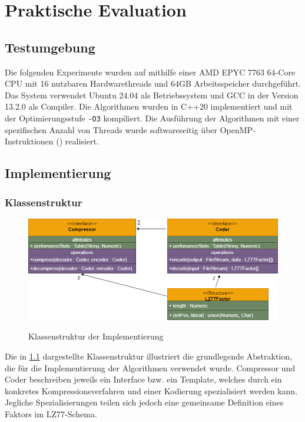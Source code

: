 \chapter{Praktische Evaluation} \label{sec:evaluation}

\section{Testumgebung}
Die folgenden Experimente wurden auf mithilfe einer AMD EPYC 7763 64-Core CPU mit 16 nutzbaren Hardwarethreads und 64GB Arbeitsspeicher durchgeführt. Das System
verwendet Ubuntu 24.04 als Betriebssystem und GCC in der Version 13.2.0 als Compiler. Die Algorithmen wurden in C++20 implementiert und mit der Optimierungsstufe
\texttt{-O3} kompiliert. Die Ausführung der Algorithmen mit einer spezifischen Anzahl von Threads wurde softwareseitig über OpenMP-Instruktionen (\cite{openmp}) realisiert. 

\section{Implementierung}

\subsection{Klassenstruktur}
\begin{figure}[ht]
    \centering
    \caption{Klassenstruktur der Implementierung}
    \includegraphics[scale=0.4]{Images/uml.png} \label{uml}
\end{figure}

Die in \ref{uml} dargestellte Klassenstruktur illustriert die grundlegende Abstraktion, die für die Implementierung der Algorithmen verwendet wurde. Compressor und
Coder beschreiben jeweils ein Interface bzw. ein Template, welches durch ein konkretes Kompressionsverfahren und einer Kodierung spezialisiert werden kann. Jegliche
Spezialisierungen teilen sich jedoch eine gemeinsame Definition eines Faktors im LZ77-Schema.

